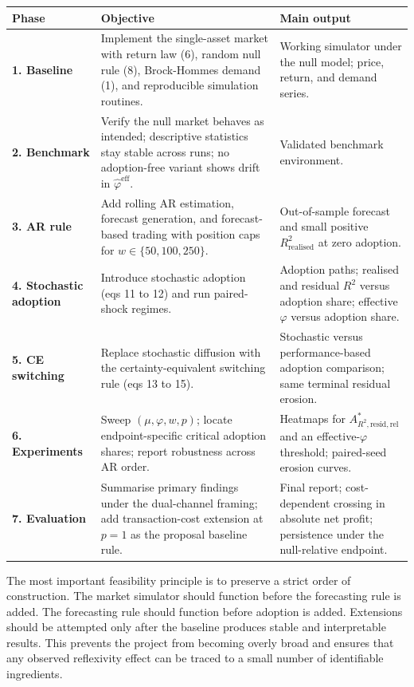 \documentclass[11pt]{article}
\begin{document}
\begin{center}
\small
\setlength{\tabcolsep}{5pt}
\renewcommand{\arraystretch}{1.18}
\begin{tabularx}{\textwidth}{@{}>{\RaggedRight\arraybackslash}p{}YY@{}}
\toprule
\textbf{Phase} & \textbf{Objective} & \textbf{Main output} \\
\midrule
\textbf{1. Baseline} &
Implement the single-asset market with return law (6), random null rule (8), Brock-Hommes demand (1), and reproducible simulation routines. &
Working simulator under the null model; price, return, and demand series. \\
\midrule
\textbf{2. Benchmark} &
Verify the null market behaves as intended; descriptive statistics stay stable across runs; no adoption-free variant shows drift in $\hat{\varphi}^{\mathrm{eff}}$. &
Validated benchmark environment. \\
\midrule
\textbf{3. AR rule} &
Add rolling AR estimation, forecast generation, and forecast-based trading with position caps for $w \in \{50, 100, 250\}$. &
Out-of-sample forecast and small positive $R^{2}_{\mathrm{realised}}$ at zero adoption. \\
\midrule
\textbf{4. Stochastic adoption} &
Introduce stochastic adoption (eqs 11 to 12) and run paired-shock regimes. &
Adoption paths; realised and residual $R^{2}$ versus adoption share; effective $\varphi$ versus adoption share. \\
\midrule
\textbf{5. CE switching} &
Replace stochastic diffusion with the certainty-equivalent switching rule (eqs 13 to 15). &
Stochastic versus performance-based adoption comparison; same terminal residual erosion. \\
\midrule
\textbf{6. Experiments} &
Sweep $(\mu, \varphi, w, p)$; locate endpoint-specific critical adoption shares; report robustness across AR order. &
Heatmaps for $A^{*}_{R^{2},\mathrm{resid},\mathrm{rel}}$ and an effective-$\varphi$ threshold; paired-seed erosion curves. \\
\midrule
\textbf{7. Evaluation} &
Summarise primary findings under the dual-channel framing; add transaction-cost extension at $p = 1$ as the proposal baseline rule. &
Final report; cost-dependent crossing in absolute net profit; persistence under the null-relative endpoint. \\
\bottomrule
\end{tabularx}
\end{center}

The most important feasibility principle is to preserve a strict order of construction. The market simulator should function before the forecasting rule is added. The forecasting rule should function before adoption is added. Extensions should be attempted only after the baseline produces stable and interpretable results. This prevents the project from becoming overly broad and ensures that any observed reflexivity effect can be traced to a small number of identifiable ingredients.
\end{document}
